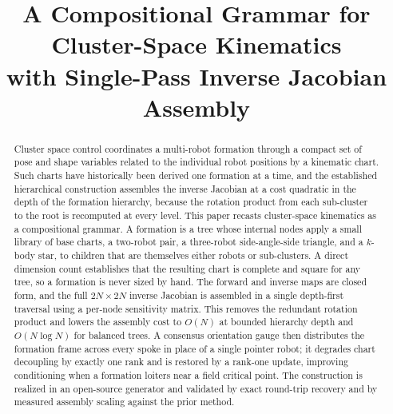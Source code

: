 \documentclass[conference]{IEEEtran}
\begin{document}
\title{A Compositional Grammar for Cluster-Space Kinematics\\ with Single-Pass Inverse Jacobian Assembly}

\author{
}

\maketitle

\begin{abstract}
Cluster space control coordinates a multi-robot formation through a compact set
of pose and shape variables related to the individual robot positions by a
kinematic chart. Such charts have historically been derived one formation at a
time, and the established hierarchical construction assembles the inverse
Jacobian at a cost quadratic in the depth of the formation hierarchy, because
the rotation product from each sub-cluster to the root is recomputed at every
level. This paper recasts cluster-space kinematics as a compositional grammar.
A formation is a tree whose internal nodes apply a small library of base charts,
a two-robot pair, a three-robot side-angle-side triangle, and a $k$-body star,
to children that are themselves either robots or sub-clusters. A direct
dimension count establishes that the resulting chart is complete and square for
any tree, so a formation is never sized by hand. The forward and inverse maps
are closed form, and the full $2N \times 2N$ inverse Jacobian is assembled in a
single depth-first traversal using a per-node sensitivity matrix. This removes
the redundant rotation product and lowers the assembly cost to $O(N)$ at bounded
hierarchy depth and $O(N \log N)$ for balanced trees. A consensus orientation
gauge then distributes the formation frame across every spoke in place of a
single pointer robot; it degrades chart decoupling by exactly one rank and is
restored by a rank-one update, improving conditioning when a formation loiters
near a field critical point. The construction is realized in an open-source
generator and validated by exact round-trip recovery and by measured assembly
scaling against the prior method.
\end{abstract}
\end{document}
